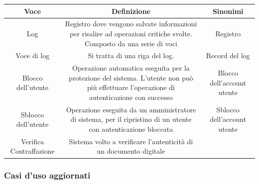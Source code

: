 \documentclass[a4paper]{article}
\begin{document}
  \begin{center}
    \begin{tabulary}{1\textwidth}{|c|C|C|}
        \hline
        \textbf{Voce} & \textbf{Definizione} & \textbf{Sinonimi}\\
        \hline
        \hline
		Log & Registro dove vengono salvate informazioni per risalire ad operazioni critiche svolte. Composto da una serie di voci & Registro \\
		\hline
		Voce di log & Si tratta di una riga del log. & Record del log\\
		\hline
		Blocco dell'utente & Operazione automatica eseguita per la protezione del sistema. L'utente non può più effettuare l'operazione di autenticazione con successo & Blocco dell'account utente \\
		\hline
		Sblocco dell'utente & Operazione eseguita da un amministratore di sistema, per il ripristino di un utente con autenticazione bloccata & Sblocco dell'account utente\\
		\hline
		Verifica Contraffazione & Sistema volto a verificare l'autenticità di un documento digitale & \\
		\hline
    \end{tabulary}
  \end{center}

\newpage

\subsubsection{Casi d'uso aggiornati}

\end{document}
